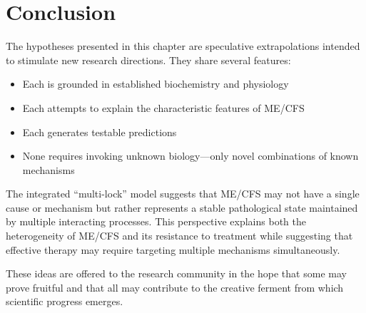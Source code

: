 





\section{Conclusion}

The hypotheses presented in this chapter are speculative extrapolations intended to stimulate new research directions. They share several features:

\begin{itemize}
    \item Each is grounded in established biochemistry and physiology
    \item Each attempts to explain the characteristic features of ME/CFS
    \item Each generates testable predictions
    \item None requires invoking unknown biology---only novel combinations of known mechanisms
\end{itemize}

The integrated ``multi-lock'' model suggests that ME/CFS may not have a single cause or mechanism but rather represents a stable pathological state maintained by multiple interacting processes. This perspective explains both the heterogeneity of ME/CFS and its resistance to treatment while suggesting that effective therapy may require targeting multiple mechanisms simultaneously.

These ideas are offered to the research community in the hope that some may prove fruitful and that all may contribute to the creative ferment from which scientific progress emerges.

